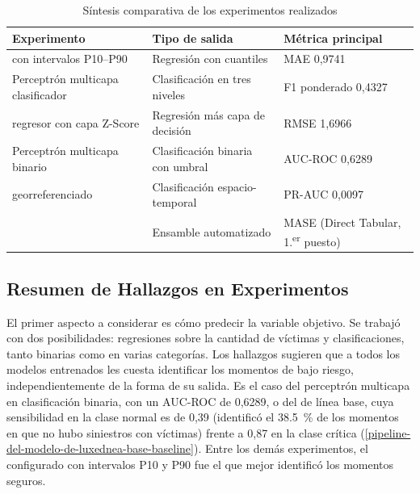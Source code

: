 \begin{table}[htbp]
\centering
\caption{Síntesis comparativa de los experimentos realizados}
\label{tab:sintesis-experimentos}
\begin{tabularx}{\linewidth}{@{}XXl@{}}
\toprule
\textbf{Experimento} & \textbf{Tipo de salida} & \textbf{Métrica principal} \\
\midrule
\lightgbm{} con intervalos P10--P90 & Regresión con cuantiles & MAE 0,9741 \\
Perceptrón multicapa clasificador & Clasificación en tres niveles & F1 ponderado 0,4327 \\
\xgboost{} regresor con capa Z-Score & Regresión más capa de decisión & RMSE 1,6966 \\
Perceptrón multicapa binario & Clasificación binaria con umbral & AUC-ROC 0,6289 \\
\xgboost{} georreferenciado & Clasificación espacio-temporal & PR-AUC 0,0097 \\
\autogluonts{} & Ensamble automatizado & MASE (Direct Tabular, 1.\textsuperscript{er} puesto) \\
\bottomrule
\end{tabularx}
\end{table}

\subsection{Resumen de Hallazgos en Experimentos}\label{resumen-de-hallazgos-en-experimentos}

El primer aspecto a considerar es cómo predecir la variable objetivo. Se trabajó con dos posibilidades: regresiones sobre la cantidad de víctimas y clasificaciones, tanto binarias como en varias categorías. Los hallazgos sugieren que a todos los modelos entrenados les cuesta identificar los momentos de bajo riesgo, independientemente de la forma de su salida. Es el caso del perceptrón multicapa en clasificación binaria, con un AUC-ROC de 0,6289, o del \xgboost{} de línea base, cuya sensibilidad en la clase normal es de 0,39 (identificó el \qty{38.5}{\percent} de los momentos en que no hubo siniestros con víctimas) frente a 0,87 en la clase crítica (\cref{pipeline-del-modelo-de-luxednea-base-baseline}). Entre los demás experimentos, el \lightgbm{} configurado con intervalos P10 y P90 fue el que mejor identificó los momentos seguros.

